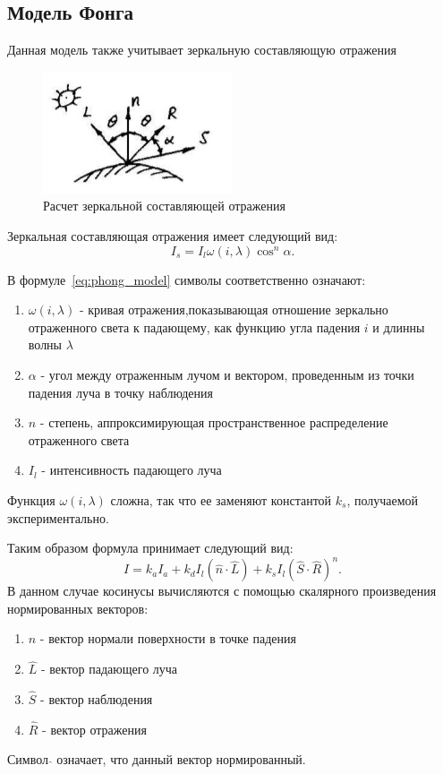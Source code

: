 \documentclass[a4paper,14pt,unknownkeysallowed]{extreport}
\begin{document}
\subsection{Модель Фонга}
Данная модель также учитывает зеркальную составляющую отражения
\begin{figure}[h]
	\centering
	\includegraphics{phong_model}
	\caption{Расчет зеркальной составляющей отражения}
	\label{fig:phong_model}
\end{figure}
\newline
Зеркальная составляющая отражения имеет следующий вид:
\begin{equation} 
	I_s = I_l\omega(i,\lambda)\cos^n \alpha.
	\label{eq:phong_model}
\end{equation}

В формуле~\ref{eq:phong_model} символы соответственно означают:
\begin{enumerate} 
	\item $\omega(i,\lambda)$ - кривая отражения,показывающая отношение зеркально отраженного света к падающему, как функцию угла падения $i$ и длинны волны $\lambda$
	\item $\alpha$ - угол между отраженным лучом и вектором, проведенным из точки падения луча в точку наблюдения 
	\item $n$ - степень, аппроксимирующая пространственное распределение отраженного света
	\item $I_l$ - интенсивность падающего луча
\end{enumerate}
Функция $\omega(i,\lambda)$ сложна, так что ее заменяют константой $k_s$, получаемой экспериментально.


Таким образом формула принимает следующий вид:
\begin{equation} 
	I = k_aI_a + k_dI_{l}(\hat{n} \cdot \hat{L}) + k_s  I_{l}(\hat{S} \cdot \hat{R})^n.
\end{equation}
В данном случае косинусы вычисляются с помощью скалярного произведения нормированных векторов:
\begin{enumerate}
	\item $\hat{n}$ - вектор нормали поверхности в точке падения
	\item $\hat{L}$ - вектор падающего луча
	\item $\hat{S}$ - вектор наблюдения
	\item $\hat{R}$ - вектор отражения
\end{enumerate}
Символ $\hat{}$ означает, что данный вектор нормированный.\cite{Rodgers}
\end{document}
